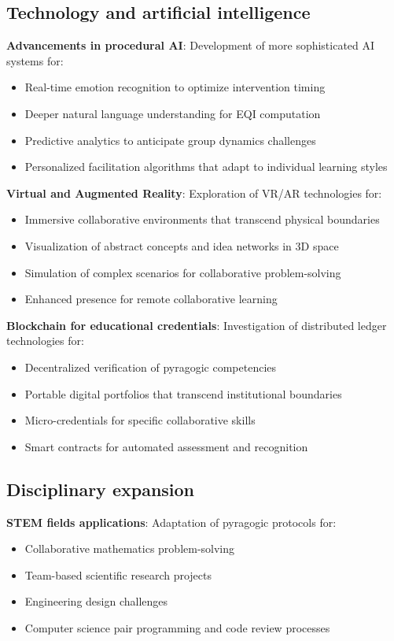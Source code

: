 \subsection{Technology and artificial intelligence}

\textbf{Advancements in procedural AI}:
Development of more sophisticated AI systems for:
\begin{itemize}
	\item Real-time emotion recognition to optimize intervention timing
	\item Deeper natural language understanding for EQI computation
	\item Predictive analytics to anticipate group dynamics challenges
	\item Personalized facilitation algorithms that adapt to individual learning styles
\end{itemize}

\textbf{Virtual and Augmented Reality}:
Exploration of VR/AR technologies for:
\begin{itemize}
	\item Immersive collaborative environments that transcend physical boundaries
	\item Visualization of abstract concepts and idea networks in 3D space
	\item Simulation of complex scenarios for collaborative problem-solving
	\item Enhanced presence for remote collaborative learning
\end{itemize}

\newpage

\textbf{Blockchain for educational credentials}:
Investigation of distributed ledger technologies for:
\begin{itemize}
	\item Decentralized verification of pyragogic competencies
	\item Portable digital portfolios that transcend institutional boundaries
	\item Micro-credentials for specific collaborative skills
	\item Smart contracts for automated assessment and recognition
\end{itemize}

\subsection{Disciplinary expansion}

\textbf{STEM fields applications}:
Adaptation of pyragogic protocols for:
\begin{itemize}
	\item Collaborative mathematics problem-solving
	\item Team-based scientific research projects
	\item Engineering design challenges
	\item Computer science pair programming and code review processes
\end{itemize}

